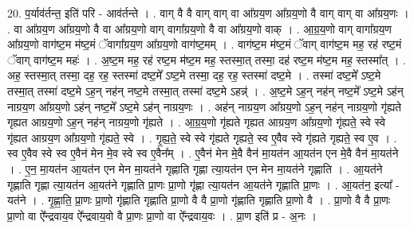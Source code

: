 \documentclass[17pt]{extarticle}
\begin{document}
20. प॒र्याव॑र्तन्त॒ इति॑ परि - आव॑र्तन्ते । . वाग् वै वै वाग् वाग् वा आ᳚ग्रय॒ण आ᳚ग्रय॒णो वै वाग् वाग् वा आ᳚ग्रय॒णः । . वा आ᳚ग्रय॒ण आ᳚ग्रय॒णो वै वा आ᳚ग्रय॒णो वाग् वागा᳚ग्रय॒णो वै वा आ᳚ग्रय॒णो वाक् । . आ॒ग्र॒य॒णो वाग् वागा᳚ग्रय॒ण आ᳚ग्रय॒णो वाग॑ष्ट॒म म॑ष्ट॒मं ॅवागा᳚ग्रय॒ण आ᳚ग्रय॒णो वाग॑ष्ट॒मम् । . वाग॑ष्ट॒म म॑ष्ट॒मं ॅवाग् वाग॑ष्ट॒म मह॒ रह॑ रष्ट॒मं ॅवाग् वाग॑ष्ट॒म महः॑ । . अ॒ष्ट॒म मह॒ रह॑ रष्ट॒म म॑ष्ट॒म मह॒ स्तस्मा॒त् तस्मा॒ दह॑ रष्ट॒म म॑ष्ट॒म मह॒ स्तस्मा᳚त् । . अह॒ स्तस्मा॒त् तस्मा॒ दह॒ रह॒ स्तस्मा॑ दष्ट॒मे᳚ ऽष्ट॒मे तस्मा॒ दह॒ रह॒ स्तस्मा॑ दष्ट॒मे । . तस्मा॑ दष्ट॒मे᳚ ऽष्ट॒मे तस्मा॒त् तस्मा॑ दष्ट॒मे ऽह॒न् नह॑न् नष्ट॒मे तस्मा॒त् तस्मा॑ दष्ट॒मे ऽहन्न्॑ । . अ॒ष्ट॒मे ऽह॒न् नह॑न् नष्ट॒मे᳚ ऽष्ट॒मे ऽह॑न् नाग्रय॒ण आ᳚ग्रय॒णो ऽह॑न् नष्ट॒मे᳚ ऽष्ट॒मे ऽह॑न् नाग्रय॒णः । . अह॑न् नाग्रय॒ण आ᳚ग्रय॒णो ऽह॒न् नह॑न् नाग्रय॒णो गृ॑ह्यते गृह्यत आग्रय॒णो ऽह॒न् नह॑न् नाग्रय॒णो गृ॑ह्यते । . आ॒ग्र॒य॒णो गृ॑ह्यते गृह्यत आग्रय॒ण आ᳚ग्रय॒णो गृ॑ह्यते॒ स्वे स्वे गृ॑ह्यत आग्रय॒ण आ᳚ग्रय॒णो गृ॑ह्यते॒ स्वे । . गृ॒ह्य॒ते॒ स्वे स्वे गृ॑ह्यते गृह्यते॒ स्व ए॒वैव स्वे गृ॑ह्यते गृह्यते॒ स्व ए॒व । . स्व ए॒वैव स्वे स्व ए॒वैन॑ मेन मे॒व स्वे स्व ए॒वैन᳚म् । . ए॒वैन॑ मेन मे॒वै वैन॑ मा॒यत॑न आ॒यत॑न एन मे॒वै वैन॑ मा॒यत॑ने । . ए॒न॒ मा॒यत॑न आ॒यत॑न एन मेन मा॒यत॑ने गृह्णाति गृह्णा त्या॒यत॑न एन मेन मा॒यत॑ने गृह्णाति । . आ॒यत॑ने गृह्णाति गृह्णा त्या॒यत॑न आ॒यत॑ने गृह्णाति प्रा॒णः प्रा॒णो गृ॑ह्णा त्या॒यत॑न आ॒यत॑ने गृह्णाति प्रा॒णः । . आ॒यत॑न॒ इत्या᳚ - यत॑ने । . गृ॒ह्णा॒ति॒ प्रा॒णः प्रा॒णो गृ॑ह्णाति गृह्णाति प्रा॒णो वै वै प्रा॒णो गृ॑ह्णाति गृह्णाति प्रा॒णो वै । . प्रा॒णो वै वै प्रा॒णः प्रा॒णो वा ऐ᳚न्द्रवाय॒व ऐ᳚न्द्रवाय॒वो वै प्रा॒णः प्रा॒णो वा ऐ᳚न्द्रवाय॒वः । . प्रा॒ण इति॑ प्र - अ॒नः । \newline
\end{document}
